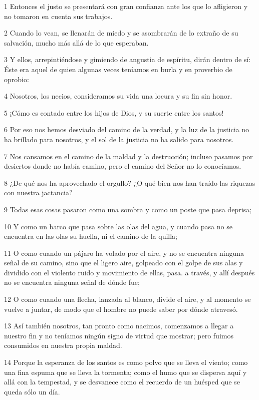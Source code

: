 \par 1 Entonces el justo se presentará con gran confianza ante los que lo afligieron y no tomaron en cuenta sus trabajos.
\par 2 Cuando lo vean, se llenarán de miedo y se asombrarán de lo extraño de su salvación, mucho más allá de lo que esperaban.
\par 3 Y ellos, arrepintiéndose y gimiendo de angustia de espíritu, dirán dentro de sí: Éste era aquel de quien algunas veces teníamos en burla y en proverbio de oprobio:
\par 4 Nosotros, los necios, consideramos su vida una locura y su fin sin honor.
\par 5 ¡Cómo es contado entre los hijos de Dios, y su suerte entre los santos!
\par 6 Por eso nos hemos desviado del camino de la verdad, y la luz de la justicia no ha brillado para nosotros, y el sol de la justicia no ha salido para nosotros.
\par 7 Nos cansamos en el camino de la maldad y la destrucción; incluso pasamos por desiertos donde no había camino, pero el camino del Señor no lo conocíamos.
\par 8 ¿De qué nos ha aprovechado el orgullo? ¿O qué bien nos han traído las riquezas con nuestra jactancia?
\par 9 Todas esas cosas pasaron como una sombra y como un poste que pasa deprisa;
\par 10 Y como un barco que pasa sobre las olas del agua, y cuando pasa no se encuentra en las olas su huella, ni el camino de la quilla;
\par 11 O como cuando un pájaro ha volado por el aire, y no se encuentra ninguna señal de su camino, sino que el ligero aire, golpeado con el golpe de sus alas y dividido con el violento ruido y movimiento de ellas, pasa. a través, y allí después no se encuentra ninguna señal de dónde fue;
\par 12 O como cuando una flecha, lanzada al blanco, divide el aire, y al momento se vuelve a juntar, de modo que el hombre no puede saber por dónde atravesó.
\par 13 Así también nosotros, tan pronto como nacimos, comenzamos a llegar a nuestro fin y no teníamos ningún signo de virtud que mostrar; pero fuimos consumidos en nuestra propia maldad.
\par 14 Porque la esperanza de los santos es como polvo que se lleva el viento; como una fina espuma que se lleva la tormenta; como el humo que se dispersa aquí y allá con la tempestad, y se desvanece como el recuerdo de un huésped que se queda sólo un día.
